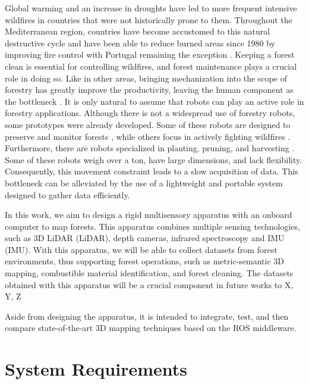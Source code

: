 Global warming and an increase in droughts have led to more frequent intensive wildfires in countries that were not historically prone to them. Throughout the Mediterranean region, countries have become accustomed to this natural destructive cycle and have been able to reduce burned areas since 1980 by improving fire control with Portugal remaining the exception \cite{turco_decreasing_2016, european_commission_joint_research_centre_forest_2021}. Keeping a forest clean is essential for controlling wildfires, and forest maintenance plays a crucial role in doing so. Like in other areas, bringing mechanization into the scope of forestry has greatly improve the productivity, leaving the human component as the bottleneck \cite{parker_robotics_2016}. It is only natural to assume that robots can play an active role in forestry applications. Although there is not a widespread use of forestry robots, some prototypes were already developed.  Some of these robots are designed to preserve and monitor forests \cite{couceiro_semfire_2019, jelavic_towards_2021, lam_flexible_2011, notomista_slothbot_2019}, while others focus in actively fighting wildfires \cite{noauthor_firefighting_2014, hose_cartridge, hydra}. Furthermore, there are robots specialized in planting, pruning, and harvesting \cite{noauthor_multiscope_nodate, molina_aerial_2017, zhang_rubber-tapping_2019}. Some of these robots weigh over a ton, have large dimensions, and lack flexibility. Consequently, this movement constraint leads to a slow acquisition of data. This bottleneck can be alleviated by the use of a lightweight and portable system designed to gather data efficiently.

In this work, we aim to design a rigid multisensory apparatus with an onboard computer to map forests. This apparatus combines multiple sensing technologies, such as 3D \acl{LiDAR} (\acs{LiDAR}), depth cameras, infrared spectroscopy and \acl{IMU} (\acs{IMU}). With this apparatus, we will be able to collect datasets from forest environments, thus supporting forest operations, such as metric-semantic 3D mapping, combustible material identification, and forest cleaning. The datasets obtained with this apparatus will be a crucial component in future works to X, Y, Z

Aside from designing the apparatus, it is intended to integrate, test, and then compare state-of-the-art 3D mapping techniques based on the ROS middleware.

\section{System Requirements}


